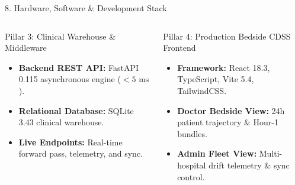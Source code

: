 \documentclass[aspectratio=169, 10pt]{beamer}
\begin{document}
\begin{frame}{8. Hardware, Software \& Development Stack}
\begin{columns}[T]
        \begin{block}{Pillar 3: Clinical Warehouse \& Middleware}
            \scriptsize
            \begin{itemize}
                \setlength\itemsep{0.05em}
                \item \textbf{Backend REST API:} FastAPI 0.115 asynchronous engine ($<5\text{ ms}$).
                \item \textbf{Relational Database:} SQLite 3.43 clinical warehouse.
                \item \textbf{Live Endpoints:} Real-time forward pass, telemetry, and sync.
            \end{itemize}
        \end{block}
        \vspace{-0.1cm}
        \begin{block}{Pillar 4: Production Bedside CDSS Frontend}
            \scriptsize
            \begin{itemize}
                \setlength\itemsep{0.05em}
                \item \textbf{Framework:} React 18.3, TypeScript, Vite 5.4, TailwindCSS.
                \item \textbf{Doctor Bedside View:} 24h patient trajectory \& Hour-1 bundles.
                \item \textbf{Admin Fleet View:} Multi-hospital drift telemetry \& sync control.
            \end{itemize}
        \end{block}
    \end{columns}
\end{frame}
\end{document}
